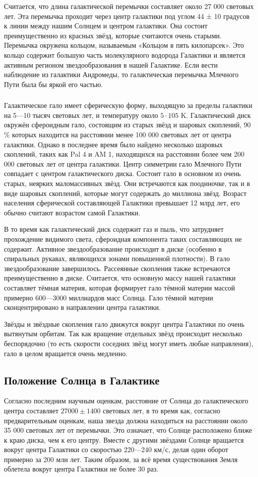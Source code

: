 Считается, что длина галактической перемычки составляет около 27 000 световых лет. Эта перемычка проходит через центр галактики под углом 44 ± 10 градусов к линии между нашим Солнцем и центром галактики. Она состоит преимущественно из красных звёзд, которые считаются очень старыми. Перемычка окружена кольцом, называемым «Кольцом в пять килопарсек». Это кольцо содержит большую часть молекулярного водорода Галактики и является активным регионом звездообразования в нашей Галактике. Если вести наблюдение из галактики Андромеды, то галактическая перемычка Млечного Пути была бы яркой его частью.
\subsubsection{}
Галактическое гало имеет сферическую форму, выходящую за пределы галактики на 5—10 тысяч световых лет, и температуру около $5\cdot105$ K. Галактический диск окружён сфероидным гало, состоящим из старых звёзд и шаровых скоплений, 90 \% которых находится на расстоянии менее 100 000 световых лет от центра галактики. Однако в последнее время было найдено несколько шаровых скоплений, таких как Pal 4 и AM 1, находящихся на расстоянии более чем 200 000 световых лет от центра галактики. Центр симметрии гало Млечного Пути совпадает с центром галактического диска. Состоит гало в основном из очень старых, неярких маломассивных звёзд. Они встречаются как поодиночке, так и в виде шаровых скоплений, которые могут содержать до миллиона звёзд. Возраст населения сферической составляющей Галактики превышает 12 млрд лет, его обычно считают возрастом самой Галактики.

В то время как галактический диск содержит газ и пыль, что затрудняет прохождение видимого света, сфероидная компонента таких составляющих не содержит. Активное звездообразование происходит в диске (особенно в спиральных рукавах, являющихся зонами повышенной плотности). В гало звездообразование завершилось. Рассеянные скопления также встречаются преимущественно в диске. Считается, что основную массу нашей галактики составляет тёмная материя, которая формирует гало тёмной материи массой примерно 600—3000 миллиардов масс Солнца. Гало тёмной материи сконцентрировано в направлении центра галактики.

Звёзды и звёздные скопления гало движутся вокруг центра Галактики по очень вытянутым орбитам. Так как вращение отдельных звёзд происходит несколько беспорядочно (то есть скорости соседних звёзд могут иметь любые направления), гало в целом вращается очень медленно.
\subsection{Положение Солнца в Галактике}
Согласно последним научным оценкам, расстояние от Солнца до галактического центра составляет $27 000 \pm 1 400$ световых лет, в то время как, согласно предварительным оценкам, наша звезда должна находиться на расстоянии около 35 000 световых лет от перемычки. Это означает, что Солнце расположено ближе к краю диска, чем к его центру. Вместе с другими звёздами Солнце вращается вокруг центра Галактики со скоростью 220—240 км/с, делая один оборот примерно за 200 млн лет. Таким образом, за всё время существования Земля облетела вокруг центра Галактики не более 30 раз.
